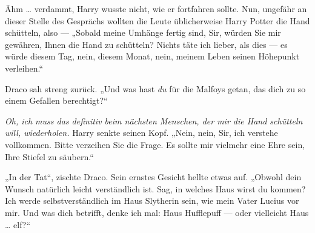 Ähm … verdammt, Harry wusste nicht, wie er fortfahren sollte. Nun, ungefähr an dieser Stelle des Gesprächs wollten die Leute üblicherweise Harry Potter die Hand schütteln, also —
„Sobald meine Umhänge fertig sind, Sir, würden Sie mir gewähren, Ihnen die Hand zu schütteln? Nichts täte ich lieber, als dies — es würde diesem Tag, nein, diesem Monat, nein, meinem Leben seinen Höhepunkt verleihen.“

Draco sah streng zurück.
„Und was hast \emph{du} für die Malfoys getan, das dich zu so einem Gefallen berechtigt?“

\emph{Oh, ich muss das definitiv beim nächsten Menschen, der mir die Hand schütteln will, wiederholen.} Harry senkte seinen Kopf.
„Nein, nein, Sir, ich verstehe vollkommen. Bitte verzeihen Sie die Frage. Es sollte mir vielmehr eine Ehre sein, Ihre Stiefel zu säubern.“

„In der Tat“, zischte Draco. Sein ernstes Gesicht hellte etwas auf.
„Obwohl dein Wunsch natürlich leicht verständlich ist. Sag, in welches Haus wirst du kommen? Ich werde selbstverständlich im Haus Slytherin sein, wie mein Vater Lucius vor mir. Und was dich betrifft, denke ich mal: Haus Hufflepuff — oder vielleicht Haus … elf?“

